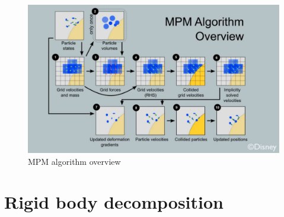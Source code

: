 \begin{itemize}
\begin{figure}[h!]
\centering
\includegraphics[width=\textwidth]{img/MPM}
\caption{MPM algorithm overview}
\label{mpm}
\end{figure}

\section{Rigid body decomposition}


\end{itemize}
